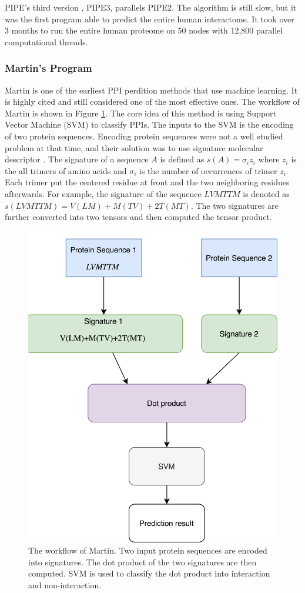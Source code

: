 PIPE's third version \cite{schoenrock2011mp}, PIPE3, parallels PIPE2. The algorithm is still slow, but it was the first program able to predict the entire human interactome. It took over 3 months to run the entire human proteome on 50 nodes with 12,800 parallel computational threads.

\subsubsection{Martin's Program}
Martin \cite{Martin05_PPIpred} is one of the earliest PPI perdition methods that use machine learning. It is highly cited and still considered one of the most effective ones. The workflow of Martin is shown in Figure \ref{fig_Martin}. The core idea of this method is using Support Vector Machine (SVM) \cite{hearst1998support} to classify PPIs. The inputs to the SVM is the encoding of two protein sequences. Encoding protein sequences were not a well studied problem at that time, and their solution was to use signature molecular descriptor \cite{visco2002developing, faulon2003signature1, faulon2003signature2}. The signature of a sequence $A$ is defined as $s(A) = \sigma_iz_i$ where $z_i$ is the all trimers of amino acids and $\sigma_i$ is the number of occurrences of trimer $z_i$. Each trimer put the centered residue at front and the two neighboring residues afterwards. For example, the signature of the sequence $LVMTTM$ is denoted as $s(LVMTTM) = V(LM)+M(TV)+2T(MT)$. The two signatures are further converted into two tensors and then computed the tensor product.
\begin{figure}[h!]
\begin{center}
\includegraphics[height =7 cm]{img/sigProd.png}
\caption[The workflow of Martin]{The workflow of Martin. Two input protein sequences are encoded into signatures. The dot product of the two signatures are then computed. SVM is used to classify the dot product into interaction and non-interaction.  \label{fig_Martin}}
\end{center}
\end{figure} 

